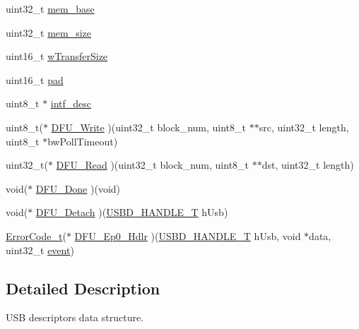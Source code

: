 \begin{DoxyCompactItemize}
\item 
uint32\+\_\+t \hyperlink{struct_u_s_b_d___d_f_u___i_n_i_t___p_a_r_a_m_a00d172e271b0f2272b052f479c3d2439}{mem\+\_\+base}
\item 
uint32\+\_\+t \hyperlink{struct_u_s_b_d___d_f_u___i_n_i_t___p_a_r_a_m_a4624ef53dbdf39e27314fa7b19d6720d}{mem\+\_\+size}
\item 
uint16\+\_\+t \hyperlink{struct_u_s_b_d___d_f_u___i_n_i_t___p_a_r_a_m_a497bbbfa6751823b9e288c257456b56f}{w\+Transfer\+Size}
\item 
uint16\+\_\+t \hyperlink{struct_u_s_b_d___d_f_u___i_n_i_t___p_a_r_a_m_a12378565018adc1588b6fd4f12e3a5dc}{pad}
\item 
uint8\+\_\+t $\ast$ \hyperlink{struct_u_s_b_d___d_f_u___i_n_i_t___p_a_r_a_m_ac124783c4a9188405cdb87399aa067ce}{intf\+\_\+desc}
\item 
uint8\+\_\+t($\ast$ \hyperlink{struct_u_s_b_d___d_f_u___i_n_i_t___p_a_r_a_m_abefbfdbb6f1154eb736f539782745b3e}{D\+F\+U\+\_\+\+Write} )(uint32\+\_\+t block\+\_\+num, uint8\+\_\+t $\ast$$\ast$src, uint32\+\_\+t length, uint8\+\_\+t $\ast$bw\+Poll\+Timeout)
\item 
uint32\+\_\+t($\ast$ \hyperlink{struct_u_s_b_d___d_f_u___i_n_i_t___p_a_r_a_m_adb7678f56abeefa8d1169fe85a66d474}{D\+F\+U\+\_\+\+Read} )(uint32\+\_\+t block\+\_\+num, uint8\+\_\+t $\ast$$\ast$dst, uint32\+\_\+t length)
\item 
void($\ast$ \hyperlink{struct_u_s_b_d___d_f_u___i_n_i_t___p_a_r_a_m_ace12153364bebed4b022776bcdf4574f}{D\+F\+U\+\_\+\+Done} )(void)
\item 
void($\ast$ \hyperlink{struct_u_s_b_d___d_f_u___i_n_i_t___p_a_r_a_m_ae4467d347854eaab0b352aa5cdef7a74}{D\+F\+U\+\_\+\+Detach} )(\hyperlink{group___u_s_b_d___core_gafdbb2204d929cb9d75736bd2b42342ac}{U\+S\+B\+D\+\_\+\+H\+A\+N\+D\+L\+E\+\_\+T} h\+Usb)
\item 
\hyperlink{error_8h_a905255056c349318139d94aa4523d516}{Error\+Code\+\_\+t}($\ast$ \hyperlink{struct_u_s_b_d___d_f_u___i_n_i_t___p_a_r_a_m_a066ab927ae9d87ecac1113648ecb51c6}{D\+F\+U\+\_\+\+Ep0\+\_\+\+Hdlr} )(\hyperlink{group___u_s_b_d___core_gafdbb2204d929cb9d75736bd2b42342ac}{U\+S\+B\+D\+\_\+\+H\+A\+N\+D\+L\+E\+\_\+T} h\+Usb, void $\ast$data, uint32\+\_\+t \hyperlink{structevent}{event})
\end{DoxyCompactItemize}


\subsection{Detailed Description}
U\+SB descriptors data structure. 

